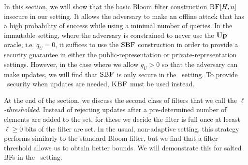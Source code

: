 In this section, we will show that the basic Bloom filter construction
$\textnormal{\textsc{BF}}[H,n]$ insecure in our setting. It allows the adversary to make an offline
attack that has a high probability of success while using a minimal number of
queries. In the immutable setting, where the adversary is constrained to never
use the $\textup{\textbf{Up}}\hspace{0.5pt}$ oracle, i.e. $q_U = 0$, it suffices to use the $\textnormal{\textsc{SBF}}$
construction in order to provide a security guarantee in either the
public-representation or private-representation settings. However, in the case
where we allow $q_U > 0$ so that the adversary can make updates, we will find
that $\textnormal{\textsc{SBF}}$ is only secure in the \erreps\ setting. To provide \errep\ security
when updates are needed, $\textnormal{\textsc{KBF}}$ must be used instead.

At the end of the section, we discuss the second class of filters that we call the
\emph{$\ell$-thresholded}. Instead of rejecting updates after a pre-determined
number of elements are added to the set, for these we decide the filter is full
once at leeast $\ell\geq0$ bits of the filter are set.
%
In the usual, non-adaptive setting, this strategy performs
similarly to the standard Bloom filter, but we find that a filter threshold
allows us to obtain better bounds.
%
We will demonstrate this for salted BFs in the \erreps\ setting.
%


